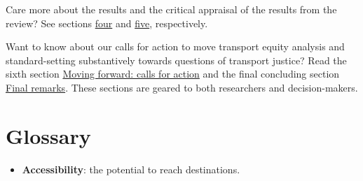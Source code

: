 \documentclass[12pt, oneside]{report}
\providecommand{\tightlist}{%
  \setlength{\itemsep}{0pt}\setlength{\parskip}{0pt}}\usepackage{longtable,booktabs,array}
\begin{document}
Care more about the results and the critical appraisal of the results
from the review? See sections \protect\hyperlink{sect4}{four} and
\protect\hyperlink{sect5}{five}, respectively.

Want to know about our calls for action to move transport equity
analysis and standard-setting substantively towards questions of
transport justice? Read the sixth section
\protect\hyperlink{sect6}{Moving forward: calls for action} and the
final concluding section \protect\hyperlink{sect7}{Final remarks}. These
sections are geared to both researchers and decision-makers.

\newpage

\hypertarget{glossary}{%
\section{Glossary}\label{glossary}}

\begin{itemize}
\tightlist
\item
  \textbf{Accessibility}: the potential to reach destinations.
\end{itemize}
\end{document}
